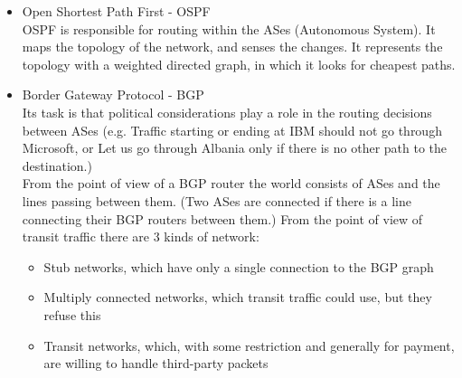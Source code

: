 \documentclass[margin=0px]{article}
\begin{document}
\begin{description}
\begin{itemize}
                  Its task is the matching of a physical address to an IP address. The newly started station sends out a packet onto the Ethernet by broadcast: ``My 48-bit Ethernet address is 14.04.05.18.01.25. Does anyone know my IP address?'' And the RARP server responds with the appropriate IP address when it sees the request.
            \item Open Shortest Path First - OSPF \\
                  OSPF is responsible for routing within the ASes (Autonomous System). It maps the topology of the network, and senses the changes. It represents the topology with a weighted directed graph, in which it looks for cheapest paths.
            \item Border Gateway Protocol - BGP \\
                  Its task is that political considerations play a role in the routing decisions between ASes (e.g. Traffic starting or ending at IBM should not go through Microsoft, or Let us go through Albania only if there is no other path to the destination.)\\
                  From the point of view of a BGP router the world consists of ASes and the lines passing between them. (Two ASes are connected if there is a line connecting their BGP routers between them.)
                  From the point of view of transit traffic there are 3 kinds of network:
                  \begin{itemize}
                      \item Stub networks, which have only a single connection to the BGP graph
                      \item Multiply connected networks, which transit traffic could use, but they refuse this
                      \item Transit networks, which, with some restriction and generally for payment, are willing to handle third-party packets
                  \end{itemize}
        \end{itemize}
\end{description}
\end{document}

